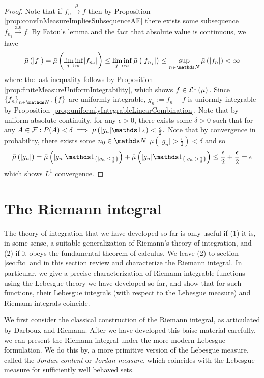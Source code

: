 \begin{proof}
Note that if $f_{n}\stackrel{\mu}{\longrightarrow}f$ then by Proposition
\ref{prop:convInMeasureImpliesSubsequenceAE} there exists some subsequence
$f_{n_{j}}\stackrel{\text{a.e}}{\longrightarrow}f$. By Fatou's lemma
and the fact that absolute value is continuous, we have
\[
\lebInt{\mu}{\lvert f\rvert}=\lebInt{\mu}{\liminf_{j\to\infty}\lvert f_{n_{j}}\rvert}\leq\liminf_{j\to\infty}\lebInt{\mu}{\lvert f_{n_{j}}\rvert}\leq\sup_{n\in\N}\lebInt{\mu}{\lvert f_{n}\rvert}<\infty
\]
where the last inequality follows by Proposition \ref{prop:finiteMeasureUniformIntegrability},
which shows $f\in\mathcal{L}^{1}\left(\mu\right).$ Since $\left\{ f_{n}\right\} _{n\in\N},\left\{ f\right\} $
are uniformly integrable, $g_{n}:=f_{n}-f$ is uniormly integrable
by Proposition \ref{prop:uniformlyIntegrableLinearCombination}. Note
that by uniform absolute continuity, for any $\epsilon>0$, there
exists some $\delta>0$ such that for any $A\in\F:P(A)<\delta\implies\lebInt{\mu}{\lvert g_{n}\rvert\indicate_{A}}<\frac{\epsilon}{2}.$
Note that by convergence in probability, there exists some $n_{0}\in\N$
$\mu\left(\lvert g_{n}\rvert>\frac{\epsilon}{2}\right)<\delta$ and
so
\[
\lebInt{\mu}{\lvert g_{n}\rvert}=\lebInt{\mu}{\lvert g_{n}\rvert\indicate_{\{\lvert g_{n}\rvert\leq\frac{\epsilon}{2}\}}}+\lebInt{\mu}{\lvert g_{n}\rvert\indicate_{\{\lvert g_{n}\rvert>\frac{\epsilon}{2}\}}}\leq\frac{\epsilon}{2}+\frac{\epsilon}{2}=\epsilon
\]
which shows $L^{1}$ convergence.
\end{proof}

\section{The Riemann integral\label{sec:riemannIntegral}}

The theory of integration that we have developed so far is only useful
if (1) it is, in some sense, a suitable generalization of Riemann's
theory of integration, and (2) if it obeys the fundamental theorem
of calculus. We leave (2) to section \ref{sec:ftc} and in this section
review and characterize the Riemann integral. In particular, we give
a precise characterization of Riemann integrable functions using the
Lebesgue theory we have developed so far, and show that for such functions,
their Lebesgue integrals (with respect to the Lebesgue measure) and
Riemann integrals coincide.

We first consider the classical construction of the Riemann integral,
as articulated by Darboux and Riemann. After we have developed this
baisc material carefully, we can present the Riemann integral under
the more modern Lebesgue formulation. We do this by, a more primitive
version of the Lebesgue measure, called the \emph{Jordan content }or
\emph{Jordan measure}, which coincides with the Lebesgue measure for
sufficiently well behaved sets.

